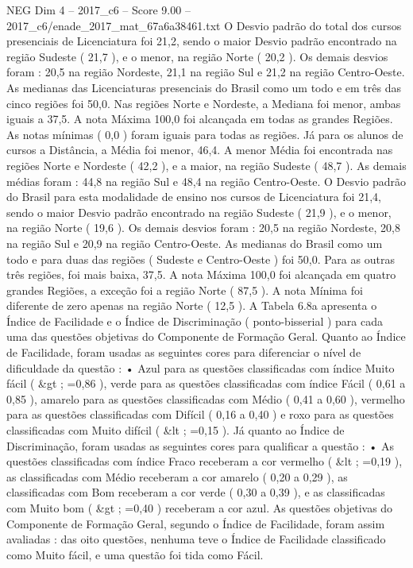 \begin{textsample}{NEG Dim 4 – 2017\_c6 – Score 9.00 – 2017\_c6/enade\_2017\_mat\_67a6a38461.txt}
O Desvio padrão do total dos cursos presenciais de Licenciatura foi 21,2, sendo o maior Desvio padrão encontrado na região Sudeste ( 21,7 ), e o menor, na região Norte ( 20,2 ).
Os demais desvios foram : 20,5 na região Nordeste, 21,1 na região Sul e 21,2 na região Centro-Oeste.
As medianas das Licenciaturas presenciais do Brasil como um todo e em três das cinco regiões foi 50,0.
Nas regiões Norte e Nordeste, a Mediana foi menor, ambas iguais a 37,5.
A nota Máxima 100,0 foi alcançada em todas as grandes Regiões.
As notas mínimas ( 0,0 ) foram iguais para todas as regiões.
Já para os alunos de cursos a Distância, a Média foi menor, 46,4.
A menor Média foi encontrada nas regiões Norte e Nordeste ( 42,2 ), e a maior, na região Sudeste ( 48,7 ).
As demais médias foram : 44,8 na região Sul e 48,4 na região Centro-Oeste.
O Desvio padrão do Brasil para esta modalidade de ensino nos cursos de Licenciatura foi 21,4, sendo o maior Desvio padrão encontrado na região Sudeste ( 21,9 ), e o menor, na região Norte ( 19,6 ).
Os demais desvios foram : 20,5 na região Nordeste, 20,8 na região Sul e 20,9 na região Centro-Oeste.
As medianas do Brasil como um todo e para duas das regiões ( Sudeste e Centro-Oeste ) foi 50,0.
Para as outras três regiões, foi mais baixa, 37,5.
A nota Máxima 100,0 foi alcançada em quatro grandes Regiões, a exceção foi a região Norte ( 87,5 ).
A nota Mínima foi diferente de zero apenas na região Norte ( 12,5 ).
A Tabela 6.8a apresenta o Índice de Facilidade e o Índice de Discriminação ( ponto-bisserial ) para cada uma das questões objetivas do Componente de Formação Geral.
Quanto ao Índice de Facilidade, foram usadas as seguintes cores para diferenciar o nível de dificuldade da questão : • Azul para as questões classificadas com índice Muito fácil ( \&gt ; =0,86 ), verde para as questões classificadas com índice Fácil ( 0,61 a 0,85 ), amarelo para as questões classificadas com Médio ( 0,41 a 0,60 ), vermelho para as questões classificadas com Difícil ( 0,16 a 0,40 ) e roxo para as questões classificadas com Muito difícil ( \&lt ; =0,15 ).
Já quanto ao Índice de Discriminação, foram usadas as seguintes cores para qualificar a questão : • As questões classificadas com índice Fraco receberam a cor vermelho ( \&lt ; =0,19 ), as classificadas com Médio receberam a cor amarelo ( 0,20 a 0,29 ), as classificadas com Bom receberam a cor verde ( 0,30 a 0,39 ), e as classificadas com Muito bom ( \&gt ; =0,40 ) receberam a cor azul.
As questões objetivas do Componente de Formação Geral, segundo o Índice de Facilidade, foram assim avaliadas : das oito questões, nenhuma teve o Índice de Facilidade classificado como Muito fácil, e uma questão foi tida como Fácil.

\end{textsample}
